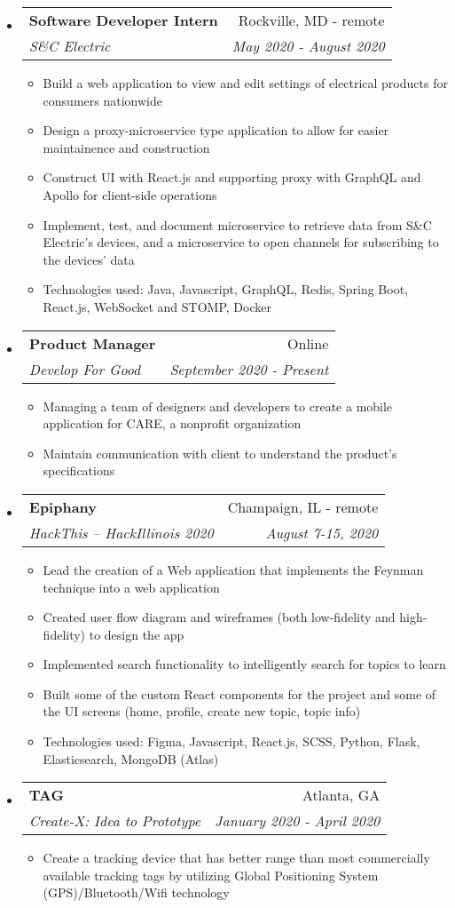 \documentclass[letterpaper,10pt]{article}
\makeatletter
\newcommand{\resitem}[1]{\item #1 \vspace{-2pt}}
\newcommand{\ressubheading}[4]{
\begin{tabular*}{7.0in}{l@{\extracolsep{\fill}}r}
		\textbf{#1} & #2 \\
		\textit{#3} & \textit{#4} \\
\end{tabular*}\vspace{-6pt}}
\makeatother
\begin{document}
\begin{itemize}
\item
    \ressubheading{Software Developer Intern}{Rockville, MD - remote}{S\&C Electric}{May 2020 - August 2020}
    \begin{itemize}
        \resitem{Build a web application to view and edit settings of electrical products for consumers nationwide}
        \resitem{Design a proxy-microservice type application to allow for easier maintainence and construction}
        \resitem{Construct UI with React.js and supporting proxy with GraphQL and Apollo for client-side operations}
        \resitem{Implement, test, and document microservice to retrieve data from S\&C Electric's devices, and a microservice to open channels for subscribing to the devices' data}
        \resitem{Technologies used: Java, Javascript, GraphQL, Redis, Spring Boot, React.js, WebSocket and STOMP, Docker}
    \end{itemize}
\item
    \ressubheading{Product Manager}{Online}{Develop For Good}{September 2020 - Present}
    \begin{itemize}
        \resitem{Managing a team of designers and developers to create a mobile application for CARE, a nonprofit organization}
        \resitem{Maintain communication with client to understand the product's specifications}
    \end{itemize}
\item
    \ressubheading{Epiphany}{Champaign, IL - remote}{HackThis -- HackIllinois 2020}{August 7-15, 2020}
    \begin{itemize}
        \resitem{Lead the creation of a Web application that implements the Feynman technique into a web application}
        \resitem{Created user flow diagram and wireframes (both low-fidelity and high-fidelity) to design the app}
        \resitem{Implemented search functionality to intelligently search for topics to learn}
        \resitem{Built some of the custom React components for the project and some of the UI screens (home, profile, create new topic, topic info)}
        \resitem{Technologies used: Figma, Javascript, React.js, SCSS, Python, Flask, Elasticsearch, MongoDB (Atlas)}
    \end{itemize}
\item
    \ressubheading{TAG}{Atlanta, GA}{Create-X: Idea to Prototype}{January 2020 - April 2020}
    \begin{itemize}
        \resitem{Create a tracking device that has better range than most commercially available tracking tags by utilizing Global Positioning System (GPS)/Bluetooth/Wifi technology}

\end{itemize}
\end{itemize}
\end{document}
